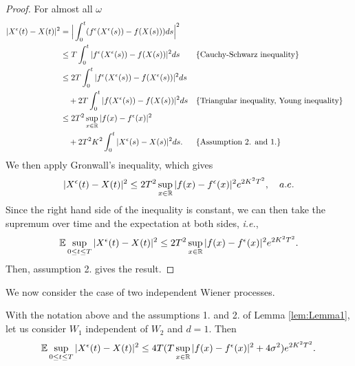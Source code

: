 \begin{proof}
For almost all $\omega$
\begin{equation*}
\begin{aligned}
	|X^\epsilon(t) - X(t)|^2  &= \Big|\int_0^t (f^\epsilon (X^\epsilon(s)) - f(X(s)))ds \Big|^2 \\
	&\leq T \int_0^t |f^\epsilon (X^\epsilon(s)) - f(X(s))|^2 ds   && \{\text{Cauchy-Schwarz inequality}\}\\
	&\leq 2T \int_0^t |f^\epsilon (X^\epsilon(s)) - f(X^\epsilon(s))|^2 ds \\
	&\quad + 2T \int_0^t |f (X^\epsilon(s)) - f(X(s))|^2 ds && \{\text{Triangular inequality, Young inequality}\} \\
	&\leq 2T^2 \sup_{x\in \mathbb{R}}|f(x) - f^\epsilon(x)|^2 \\
	&\quad + 2T^2K^2 \int_0^t |X^\epsilon(s) - X(s)|^2ds. && \{\text{Assumption 2. and 1.}\} 
\end{aligned} 
\end{equation*}
We then apply Gronwall's inequality, which gives 
\begin{equation}\label{eq:TheoryEpsilon}
	|X^\epsilon(t) - X(t)|^2 \leq  2T^2 \sup_{x\in \mathbb{R}}|f(x) - f^\epsilon(x)|^2 e^{2K^2T^2}, \quad a.e.
\end{equation}
Since the right hand side of the inequality is constant, we can then take the supremum over time and the expectation at both sides, \textit{i.e.},
\begin{equation*}
	\mathbb{E} \sup_{0 \leq t \leq T} |X^\epsilon(t) - X(t)|^2 \leq  2T^2 \sup_{x\in \mathbb{R}}|f(x) - f^\epsilon(x)|^2 e^{2K^2T^2}.
\end{equation*}
Then, assumption 2. gives the result.
\end{proof}
\noindent We now consider the case of two independent Wiener processes.

\begin{lemma}\label{lem:Lemma2} With the notation above and the assumptions 1. and 2. of Lemma \ref{lem:Lemma1}, let us consider $W_1$ independent of $W_2$ and $d = 1$. Then
\begin{equation*}	
	\mathbb{E} \sup_{0 \leq t \leq T} |X^\epsilon(t) - X(t)|^2 \leq 4T(T \sup_{x\in \mathbb{R}}|f(x) - f^\epsilon(x)|^2 + 4\sigma^2) e^{2K^2T^2}.
\end{equation*}
\end{lemma}


